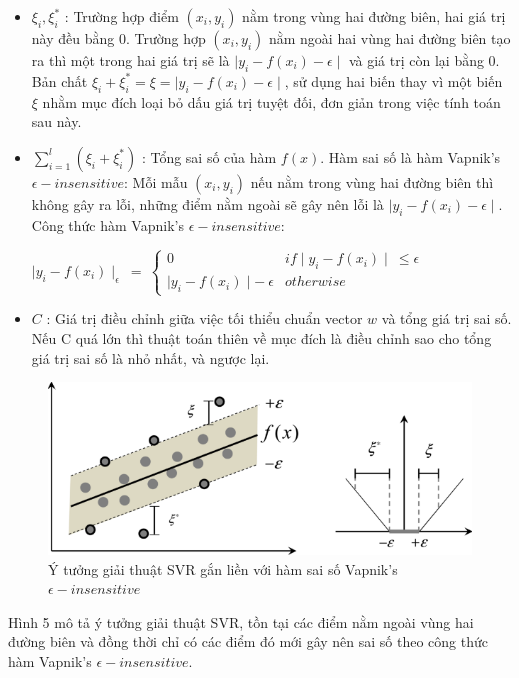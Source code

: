 \documentclass[12pt]{extarticle}
\begin{document}
				\begin{itemize}
					\item $\xi_{i}, \xi_i^*$ : Trường hợp điểm $(x_{i},y_{i})$ nằm trong vùng hai đường biên, hai giá trị này đều bằng 0. Trường hợp $(x_{i},y_{i})$ nằm ngoài hai vùng hai đường biên tạo ra thì một trong hai giá trị sẽ là $\mid y_{i} - f(x_{i})-\epsilon\mid$ và giá trị còn lại bằng 0. Bản chất  $\xi_{i} + \xi_i^ * = \xi= \mid y_{i} - f(x_{i})-\epsilon\mid$, sử dụng hai biến thay vì một biến $\xi$ nhằm mục đích loại bỏ dấu giá trị tuyệt đối, đơn giản trong việc tính toán sau này.
					\item $\sum_{i=1}^l(\xi_{i}+\xi_i^*)$ : Tổng sai số của hàm $f(x)$. Hàm sai số là hàm Vapnik's $\epsilon - insensitive$: Mỗi mẫu $(x_{i},y_{i})$ nếu nằm trong vùng hai đường biên thì không gây ra lỗi, những điểm nằm ngoài sẽ gây nên lỗi là $\mid y_{i} - f(x_{i})-\epsilon\mid$. Công thức hàm Vapnik's $\epsilon - insensitive$:
					\begin{center}
						$\mid y_{i} - f(x_{i})\mid_{\epsilon} \:=\:\begin{cases}0 &  if \mid y_{i} - f(x_{i})\mid \:\leq \epsilon\\\mid y_{i} - f(x_{i})\mid - \: \epsilon & otherwise\end{cases} $ 
					\end{center}
					\item $C$ : Giá trị điều chỉnh giữa việc tối thiểu chuẩn vector $w$ và tổng giá trị sai số. Nếu C quá lớn thì thuật toán thiên về mục đích là điều chỉnh sao cho tổng giá trị sai số là nhỏ nhất, và ngược lại.
				\end{itemize}
			\begin{figure}[h!]
				\includegraphics[width=\linewidth]{svr}
				\caption[Minh họa cách tính sai số trong mô hình SVR]{Ý tưởng giải thuật SVR gắn liền với hàm sai số Vapnik's $\epsilon - insensitive$  \footnotemark{}}
				\label{fig:svr}
			\end{figure}
			\par Hình 5 mô tả ý tưởng giải thuật SVR, tồn tại các điểm nằm ngoài vùng hai đường biên và đồng thời  chỉ có các điểm đó mới gây nên sai số theo công thức hàm  Vapnik's $\epsilon - insensitive$.
\end{document}
